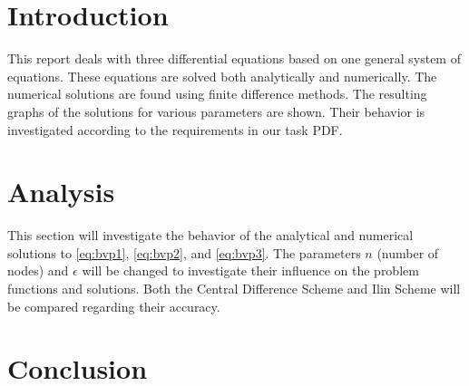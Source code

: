 \documentclass[a4paper, 12pt, reqno]{article}
\title{\titl}
\author{\auth}
\date{\today}
\begin{document}
\maketitle
\begin{abstract}\noindent
    This report deals with numerical solutions to second order differential
    equations using finite difference methods. The problems were chosen 
    according to my readme file. The finite difference methods in this report 
    are the Central Difference Scheme and the Ilin Scheme. With their help the 
    test problems' analytical and numerical solutions for various parameter 
    values are considered.
\end{abstract}
\tableofcontents

\section{Introduction}

This report deals with three differential equations based on one general system 
of equations. These equations are solved both analytically and numerically.
The numerical solutions are found using finite difference methods. The 
resulting graphs of the solutions for various parameters are shown. Their 
behavior is investigated according to the requirements in our task PDF.



\section{Analysis}

This section will investigate the behavior of the analytical and numerical
solutions to \eqref{eq:bvp1}, \eqref{eq:bvp2}, and \eqref{eq:bvp3}. The 
parameters $n$ (number of nodes) and $\epsilon$ will be changed to investigate
their influence on the problem functions and solutions. Both the Central 
Difference Scheme and Ilin Scheme will be compared regarding their accuracy.









\newpage
\section{Conclusion}
\end{document}
